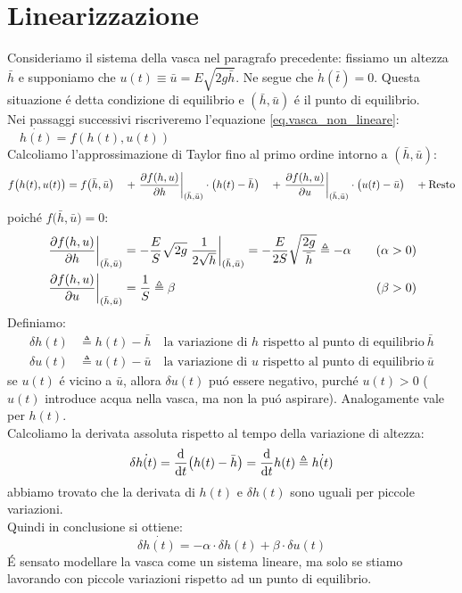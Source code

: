 \documentclass[../main.tex]{subfiles}
\begin{document}
	\section{Linearizzazione}
		Consideriamo il sistema della vasca nel paragrafo precedente: fissiamo un altezza $ \bar{h} $ e supponiamo che $ u(t) \equiv \bar{u} = E \sqrt{\overset{  }{2g \bar{h}}} $. Ne segue che $ \dot{h}(\bar{t}) = 0 $. Questa situazione \'e detta condizione di equilibrio e $( \bar{h} , \bar{u}) $ \'e il punto di equilibrio.\\
		\newline
		Nei passaggi successivi riscriveremo l'equazione \ref{eq.vasca_non_lineare}: $ \quad \dot{h(t)} = f(h(t),u(t)) $\\		
		\newline
		Calcoliamo l'approssimazione di Taylor fino al primo ordine intorno a \( (\bar{h},\bar{u}) \):
		\[
			f \big( h(t),u(t) \big) = 
			f \big(\bar{h},\bar{u} \big) \quad
			+ \left. \frac{\partial f(h,u)}{\partial h} \right|_{(\bar{h},\bar{u})} \cdot \big( h(t) - \bar{h} \big) \quad
			+ \left. \frac{\partial f(h,u)}{\partial u} \right|_{(\bar{h},\bar{u})} \cdot \big( u(t) - \bar{u} \big) \quad
			+ \text{Resto}
		\]
		poich\'e $ f \big( \bar{h},\bar{u} \big) = 0 $:
		\[
			\begin{aligned}
				\left. \frac{\partial f(h,u)}{\partial h} \right|_{(\bar{h},\bar{u})} &= - \frac{E}{S} \sqrt{2g} \left. \frac{1}{2\sqrt{h}} \right|_{(\bar{h},\bar{u})} = - \frac{E}{2S} \sqrt{\frac{2g}{\bar{h}}} \triangleq  - \alpha \quad &(\alpha > 0)
				\\
				\left. \frac{\partial f(h,u)}{\partial u} \right|_{(\bar{h},\bar{u})} &= \frac{1}{S} \triangleq  \beta \quad &(\beta > 0)
			\end{aligned}
		\]
		Definiamo:
		\[
			\begin{aligned}
				\delta h(t) &\triangleq h(t)- \bar{h} \quad \text{la variazione di $h$ rispetto al punto di equilibrio}\ \bar h
				\\
				\delta u(t) &\triangleq u(t)- \bar{u} \quad \text{la variazione di $u$ rispetto al punto di equilibrio}\ \bar u
			\end{aligned}
		\]
		se $ u(t) $ \'e vicino a $ \bar{u} $, allora $ \delta u(t) $ pu\'o essere negativo, purch\'e $ u(t)>0 $ ($ u(t) $ introduce acqua nella vasca, ma non la pu\'o aspirare). Analogamente vale per $ h(t) $.\\		
		\newline
		Calcoliamo la derivata assoluta rispetto al tempo della variazione di altezza:
		\[
			\delta \dot{h(t)} = \frac{\mathrm{d} }{\mathrm{d} t} \big( h(t)-\bar{h} \big) = \frac{\mathrm{d} }{\mathrm{d} t} h(t) \triangleq \dot{h(t)}
		\] 
		abbiamo trovato che la derivata di $h(t)$ e $\delta h(t)$ sono uguali per piccole variazioni.\\
		\newline
		Quindi in conclusione si ottiene:
		\[
			\delta \dot{h(t)} = -\alpha \cdot \delta h(t) + \beta \cdot \delta u(t)
		\]
		\'E sensato modellare la vasca come un sistema lineare, ma solo se stiamo lavorando con piccole variazioni rispetto ad un punto di equilibrio.
\end{document}
